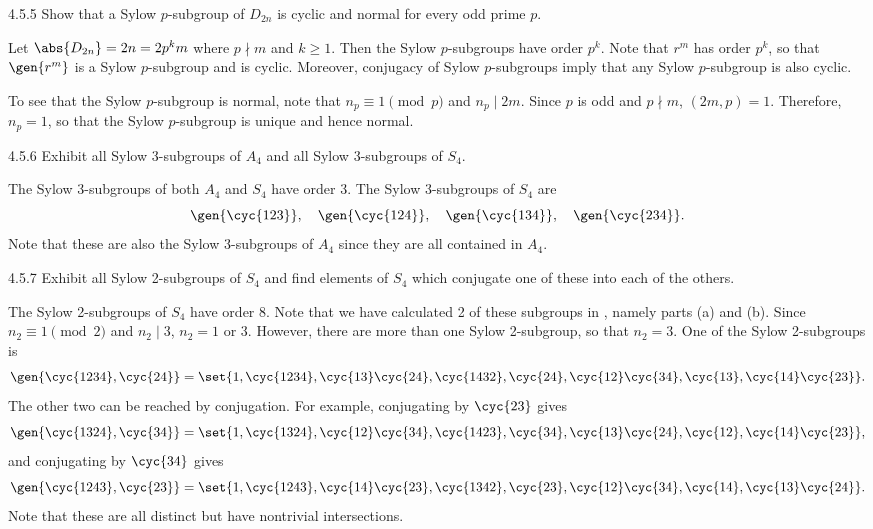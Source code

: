 \begin{exercise}{4.5.5}
	Show that a Sylow $p$-subgroup of $D_{2n}$ is cyclic and normal for every odd prime $p$.
\end{exercise}

\begin{sol}
	Let $\abs{D_{2n}} = 2n = 2 p^k m$ where $p \nmid m$ and $k \geq 1$.
	Then the Sylow $p$-subgroups have order $p^k$.
	Note that $r^m$ has order $p^k$, so that $\gen{r^m}$ is a Sylow $p$-subgroup and is cyclic.
	Moreover, conjugacy of Sylow $p$-subgroups imply that any Sylow $p$-subgroup is also cyclic.

	To see that the Sylow $p$-subgroup is normal, note that $n_p \equiv 1 \pmod p$ and $n_p \mid 2m$.
	Since $p$ is odd and $p \nmid m$, $(2m, p) = 1$.
	Therefore, $n_p = 1$, so that the Sylow $p$-subgroup is unique and hence normal.
\end{sol}

\begin{exercise}{4.5.6}
	Exhibit all Sylow 3-subgroups of $A_4$ and all Sylow 3-subgroups of $S_4$.
\end{exercise}

\begin{sol}
	The Sylow 3-subgroups of both $A_4$ and $S_4$ have order 3.
	The Sylow 3-subgroups of $S_4$ are
	\[
		\gen{\cyc{1 2 3}}, \quad \gen{\cyc{1 2 4}}, \quad \gen{\cyc{1 3 4}}, \quad \gen{\cyc{2 3 4}}.
	\]
	Note that these are also the Sylow 3-subgroups of $A_4$ since they are all contained in $A_4$.
\end{sol}

\begin{exercise}{4.5.7}
	Exhibit all Sylow 2-subgroups of $S_4$ and find elements of $S_4$ which conjugate one of these into each of the others.
\end{exercise}

\begin{sol}
	The Sylow 2-subgroups of $S_4$ have order 8.
	Note that we have calculated 2 of these subgroups in , namely parts (a) and (b).
	Since $n_2 \equiv 1 \pmod 2$ and $n_2 \mid 3$, $n_2 = 1$ or $3$.
	However, there are more than one Sylow 2-subgroup, so that $n_2 = 3$.
	One of the Sylow 2-subgroups is
	\[
		\gen{\cyc{1 2 3 4}, \cyc{2 4}} = \set{1, \cyc{1 2 3 4}, \cyc{1 3}\cyc{2 4}, \cyc{1 4 3 2}, \cyc{2 4}, \cyc{1 2}\cyc{3 4}, \cyc{1 3}, \cyc{1 4}\cyc{2 3}}.
	\]
	The other two can be reached by conjugation.
	For example, conjugating by $\cyc{2 3}$ gives
	\[
		\gen{\cyc{1 3 2 4}, \cyc{3 4}} = \set{1, \cyc{1 3 2 4}, \cyc{1 2}\cyc{3 4}, \cyc{1 4 2 3}, \cyc{3 4}, \cyc{1 3}\cyc{2 4}, \cyc{1 2}, \cyc{1 4}\cyc{2 3}},
	\]
	and conjugating by $\cyc{3 4}$ gives
	\[
		\gen{\cyc{1 2 4 3}, \cyc{2 3}} = \set{1, \cyc{1 2 4 3}, \cyc{1 4}\cyc{2 3}, \cyc{1 3 4 2}, \cyc{2 3}, \cyc{1 2}\cyc{3 4}, \cyc{1 4}, \cyc{1 3}\cyc{2 4}}.
	\]
	Note that these are all distinct but have nontrivial intersections.
\end{sol}

